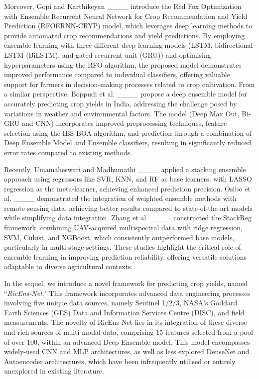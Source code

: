Moreover, Gopi and Karthikeyan ____ introduce the Red Fox Optimization with Ensemble Recurrent Neural Network for Crop Recommendation and Yield Prediction (RFOERNN-CRYP) model, which leverages deep learning methods to provide automated crop recommendations and yield predictions. By employing ensemble learning with three different deep learning models (LSTM, bidirectional LSTM (BiLSTM), and gated recurrent unit (GRU)) and optimising hyperparameters using the RFO algorithm, the proposed model demonstrates improved performance compared to individual classifiers, offering valuable support for farmers in decision-making processes related to crop cultivation. From a similar perspective, Boppudi et al. ____ propose a deep ensemble model for accurately predicting crop yields in India, addressing the challenge posed by variations in weather and environmental factors. The model (Deep Max Out, Bi-GRU and CNN) incorporates improved preprocessing techniques, feature selection using the IBS-BOA algorithm, and prediction through a combination of Deep Ensemble Model and Ensemble classifiers, resulting in significantly reduced error rates compared to existing methods.

Recently, Umamaheswari and Madhumathi ____ applied a stacking ensemble approach using regressors like SVR, KNN, and RF as base learners, with LASSO regression as the meta-learner, achieving enhanced prediction precision. Osibo et al. ____ demonstrated the integration of weighted ensemble methods with remote sensing data, achieving better results compared to state-of-the-art models while simplifying data integration. Zhang et al. ____ constructed the StackReg framework, combining UAV-acquired multispectral data with ridge regression, SVM, Cubist, and XGBoost, which consistently outperformed base models, particularly in multi-stage settings. These studies highlight the critical role of ensemble learning in improving prediction reliability, offering versatile solutions adaptable to diverse agricultural contexts.

In the sequel, we introduce a novel framework for predicting crop yields, named ``\textit{RicEns-Net}." This framework incorporates advanced data engineering processes involving five unique data sources, namely Sentinel 1/2/3, NASA's Goddard Earth Sciences (GES) Data and Information Services Centre (DISC), and field measurements. The novelty of RicEns-Net lies in its integration of these diverse and rich sources of multi-modal data, comprising 15 features selected from a pool of over 100, within an advanced Deep Ensemble model. This model encompasses widely-used CNN and MLP architectures, as well as less explored DenseNet and Autoencoder architectures, which have been infrequently utilised or entirely unexplored in existing literature.

